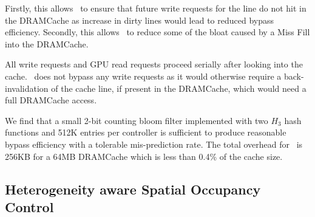 Firstly, this allows \bypassname\ to ensure that future write requests for the line do not hit in the DRAMCache as increase in dirty lines would lead to reduced bypass efficiency. 
Secondly, this allows \bypassname\ to reduce some of the bloat caused by a Miss Fill \cite{bear} into the DRAMCache.
\par All write requests and GPU read requests proceed serially after looking into the cache. \bypassname\ does not bypass any write requests as it would otherwise require a back-invalidation of the cache line, if present in the DRAMCache, which would need a full DRAMCache access.
\par We find that a small 2-bit counting bloom filter implemented with two $H_3$ hash functions \cite{h3} and 512K entries per controller is sufficient 
to produce reasonable bypass efficiency with a tolerable mis-prediction rate. The total overhead for \bypassname\ is 256KB for a 64MB DRAMCache which is less than 0.4\% of the cache size.


\subsection{Heterogeneity aware Spatial Occupancy Control} \label{mechanism-chaining}

